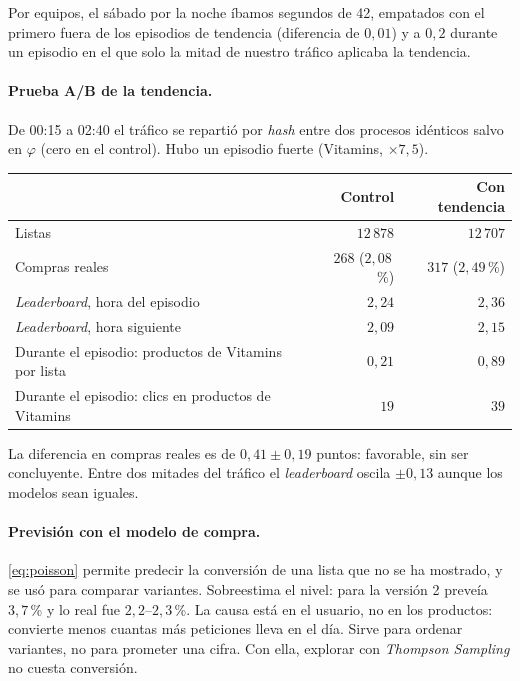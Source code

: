 \documentclass[11pt,a4paper]{article}
\begin{document}
Por equipos, el sábado por la noche íbamos segundos de 42, empatados con el primero fuera de los episodios
de tendencia (diferencia de $0{,}01$) y a $0{,}2$ durante un episodio en el que solo la mitad de nuestro
tráfico aplicaba la tendencia.

\paragraph{Prueba A/B de la tendencia.} De 00:15 a 02:40 el tráfico se repartió por \emph{hash} entre dos
procesos idénticos salvo en $\varphi$ (cero en el control). Hubo un episodio fuerte (Vitamins, $\times7{,}5$).

\begin{center}
\small
\begin{tabular}{lrr}
\toprule
 & Control & Con tendencia\\
\midrule
Listas & $12\,878$ & $12\,707$\\
Compras reales & $268$ ($2{,}08$\,\%) & $317$ ($2{,}49$\,\%)\\
\emph{Leaderboard}, hora del episodio & $2{,}24$ & $2{,}36$\\
\emph{Leaderboard}, hora siguiente & $2{,}09$ & $2{,}15$\\
Durante el episodio: productos de Vitamins por lista & $0{,}21$ & $0{,}89$\\
Durante el episodio: clics en productos de Vitamins & $19$ & $39$\\
\bottomrule
\end{tabular}
\end{center}

La diferencia en compras reales es de $0{,}41\pm0{,}19$ puntos: favorable, sin ser concluyente. Entre dos
mitades del tráfico el \emph{leaderboard} oscila $\pm0{,}13$ aunque los modelos sean iguales.

\paragraph{Previsión con el modelo de compra.} \eqref{eq:poisson} permite predecir la conversión de una
lista que no se ha mostrado, y se usó para comparar variantes. Sobreestima el nivel: para la versión 2
preveía $3{,}7$\,\% y lo real fue $2{,}2$--$2{,}3$\,\%. La causa está en el usuario, no en los productos:
convierte menos cuantas más peticiones lleva en el día. Sirve para ordenar variantes, no para prometer
una cifra. Con ella, explorar con \emph{Thompson Sampling} no cuesta conversión.
\end{document}
